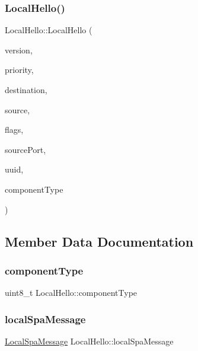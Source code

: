 \subsubsection{\texorpdfstring{Local\+Hello()}{LocalHello()}}
{\footnotesize\ttfamily Local\+Hello\+::\+Local\+Hello (\begin{DoxyParamCaption}\item[{uint8\+\_\+t}]{version,  }\item[{uint8\+\_\+t}]{priority,  }\item[{\hyperlink{structLogicalAddress}{Logical\+Address}}]{destination,  }\item[{\hyperlink{structLogicalAddress}{Logical\+Address}}]{source,  }\item[{uint16\+\_\+t}]{flags,  }\item[{uint16\+\_\+t}]{source\+Port,  }\item[{uint64\+\_\+t}]{uuid,  }\item[{uint8\+\_\+t}]{component\+Type }\end{DoxyParamCaption})\hspace{0.3cm}{\ttfamily [inline]}}



\subsection{Member Data Documentation}
\mbox{\label{structLocalHello_a1814191cf0ab5e8b281ff3d3f2b455cc}} 
\subsubsection{\texorpdfstring{component\+Type}{componentType}}
{\footnotesize\ttfamily uint8\+\_\+t Local\+Hello\+::component\+Type}

\mbox{\label{structLocalHello_a89f32f528654b416a69c06083fa2c326}} 
\subsubsection{\texorpdfstring{local\+Spa\+Message}{localSpaMessage}}
{\footnotesize\ttfamily \hyperlink{structLocalSpaMessage}{Local\+Spa\+Message} Local\+Hello\+::local\+Spa\+Message}

